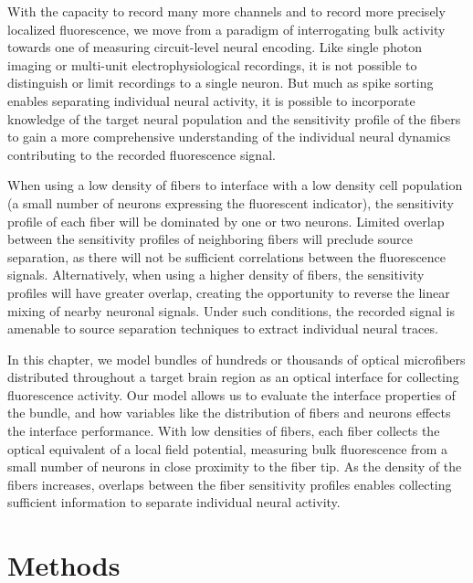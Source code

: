 With the capacity to record many more channels and to record more precisely localized fluorescence, we move from a paradigm of interrogating bulk activity towards one of measuring circuit-level neural encoding. Like single photon imaging or multi-unit electrophysiological recordings, it is not possible to distinguish or limit recordings to a single neuron. But much as spike sorting enables separating individual neural activity, it is possible to incorporate knowledge of the target neural population and the sensitivity profile of the fibers to gain a more comprehensive understanding of the individual neural dynamics contributing to the recorded fluorescence signal. 

When using a low density of fibers to interface with a low density cell population (a small number of neurons expressing the fluorescent indicator), the sensitivity profile of each fiber will be dominated by one or two neurons. Limited overlap between the sensitivity profiles of neighboring fibers will preclude source separation, as there will not be sufficient correlations between the fluorescence signals. Alternatively, when using a higher density of fibers, the sensitivity profiles will have greater overlap, creating the opportunity to reverse the linear mixing of nearby neuronal signals. Under such conditions, the recorded signal is amenable to source separation techniques to extract individual neural traces.

In this chapter, we model bundles of hundreds or thousands of optical microfibers distributed throughout a target brain region as an optical interface for collecting fluorescence activity. Our model allows us to evaluate the interface properties of the bundle, and how variables like the distribution of fibers and neurons effects the interface performance. With low densities of fibers, each fiber collects the optical equivalent of a local field potential, measuring bulk fluorescence from a small number of neurons in close proximity to the fiber tip. As the density of the fibers increases, overlaps between the fiber sensitivity profiles enables collecting sufficient information to separate individual neural activity.

\section{Methods}
\label{sec:methods-modeling}

